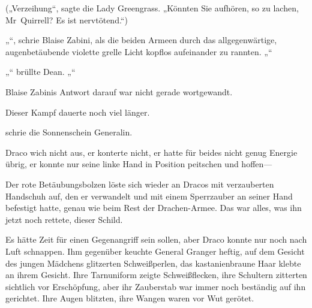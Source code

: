 („Verzeihung“, sagte die Lady Greengrass. „Könnten Sie aufhören, so zu lachen, Mr~Quirrell? Es ist nervtötend.“)

„“, schrie Blaise Zabini, als die beiden Armeen durch das allgegenwärtige, augenbetäubende violette grelle Licht kopflos aufeinander zu rannten. „“

„“ brüllte Dean. „“

Blaise Zabinis Antwort darauf war nicht gerade wortgewandt.

Dieser Kampf dauerte noch viel länger.

\later

 schrie die Sonnenschein Generalin.

Draco wich nicht aus, er konterte nicht, er hatte für beides nicht genug Energie übrig, er konnte nur seine linke Hand in Position peitschen und hoffen—

Der rote Betäubungsbolzen löste sich wieder an Dracos mit  verzauberten Handschuh auf, den er verwandelt und mit einem Sperrzauber an seiner Hand befestigt hatte, genau wie beim Rest der Drachen-Armee. Das war alles, was ihn jetzt noch rettete, dieser Schild.

Es hätte Zeit für einen Gegenangriff sein sollen, aber Draco konnte nur noch nach Luft schnappen. Ihm gegenüber keuchte General Granger heftig, auf dem Gesicht des jungen Mädchens glitzerten Schweißperlen, das kastanienbraune Haar klebte an ihrem Gesicht. Ihre Tarnuniform zeigte Schweißflecken, ihre Schultern zitterten sichtlich vor Erschöpfung, aber ihr Zauberstab war immer noch beständig auf ihn gerichtet. Ihre Augen blitzten, ihre Wangen waren vor Wut gerötet.


